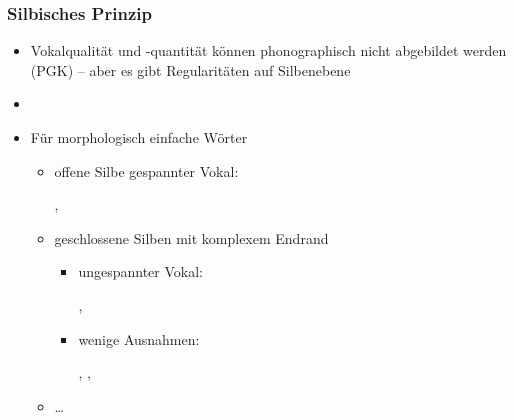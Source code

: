 \begin{frame}
\frametitle{Silbisches Prinzip}

\begin{itemize}
	\item Vokalqualität und -quantität können phonographisch nicht abgebildet werden (PGK) -- aber es gibt Regularitäten auf Silbenebene
	\item[]
	\item Für morphologisch einfache Wörter 
	
	\begin{itemize}
		\item offene Silbe \ras gespannter Vokal: 
		
		  \ea
                  , 
                  \z
		
		\item geschlossene Silben mit komplexem Endrand
		
		\begin{itemize}
			\item \ras ungespannter Vokal: 
			
			  \ea
                          , 
                          \z
			
			\item wenige Ausnahmen: 
			
			  \ea
                          , , 
                          \z
			
		\end{itemize}
		\item \dots
	\end{itemize}
\end{itemize}


\end{frame}



